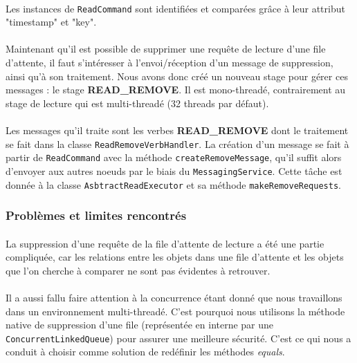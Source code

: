 \documentclass[12pt]{article}
\newcommand{\class}[1]{\texttt{#1}}
\begin{document}
\paragraph{}Les instances de \class{ReadCommand} sont identifiées et comparées grâce à leur attribut "timestamp" et "key".

\paragraph{}Maintenant qu'il est possible de supprimer une requête de lecture d'une file d'attente, il faut s'intéresser à l'envoi/réception d'un message de suppression, ainsi qu'à son traitement. Nous avons donc créé un nouveau stage pour gérer ces messages : le stage \textbf{READ\_REMOVE}. Il est mono-threadé, contrairement au stage de lecture qui est multi-threadé (32 threads par défaut).

\paragraph{}Les messages qu'il traite sont les verbes \textbf{READ\_REMOVE} dont le traitement se fait dans la classe \class{ReadRemoveVerbHandler}. La création d'un message se fait à partir de \class{ReadCommand} avec la méthode \texttt{createRemoveMessage}, qu'il suffit alors d'envoyer aux autres noeuds par le biais du \class{MessagingService}. Cette tâche est donnée à la classe \class{AsbtractReadExecutor} et sa méthode \texttt{makeRemoveRequests}.

\subsubsection*{Problèmes et limites rencontrés}

\paragraph{}La suppression d'une requête de la file d'attente de lecture a été une partie compliquée, car les relations entre les objets dans une file d'attente et les objets que l'on cherche à comparer ne sont pas évidentes à retrouver.

\paragraph{}Il a aussi fallu faire attention à la concurrence étant donné que nous travaillons dans un environnement multi-threadé. C'est pourquoi nous utilisons la méthode native de suppression d'une file (représentée en interne par une \class{ConcurrentLinkedQueue}) pour assurer une meilleure sécurité. C'est ce qui nous a conduit à choisir comme solution de redéfinir les méthodes \textit{equals}.
\end{document}
